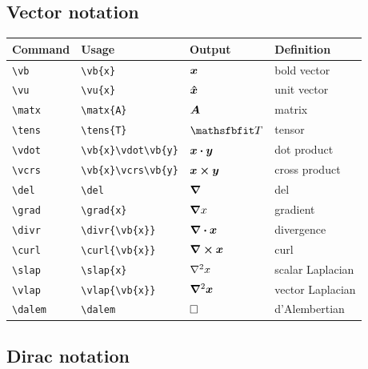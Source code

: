\documentclass[11pt]{article}
\begin{document}
\subsection{Vector notation}

\begin{tabular}{llll}
    Command       & Usage                      & Output                & Definition       \\
    \hline
    \verb|\vb|    & \verb|\vb{x}|              & $\bm{x}$              & bold vector      \\
    \verb|\vu|    & \verb|\vu{x}|              & $\bm{\hat{x}}$              & unit vector      \\
    \verb|\matx|  & \verb|\matx{A}|            & $\bm{A}$            & matrix           \\
    \verb|\tens|  & \verb|\tens{T}|            & $\tens{T}$            & tensor           \\
    \verb|\vdot|  & \verb|\vb{x}\vdot\vb{y}|   & $\bm{x}\bm{\cdot}\bm{y}$   & dot product      \\
    \verb|\vcrs|  & \verb|\vb{x}\vcrs\vb{y}|   & $\bm{x}\bm{\times}\bm{y}$   & cross product    \\
    \verb|\del|   & \verb|\del|                & $\bm{\nabla}$                & del              \\
    \verb|\grad|  & \verb|\grad{x}|            & $\bm{\nabla} x$            & gradient         \\
    \verb|\divr|  & \verb|\divr{\vb{x}}|       & $\bm{\nabla} \bm{\cdot} \bm{x}$       & divergence       \\
    \verb|\curl|  & \verb|\curl{\vb{x}}|       & $\bm{\nabla} \bm{\times} \bm{x}$       & curl             \\
    \verb|\slap|  & \verb|\slap{x}|            & $\nabla^{2} x$            & scalar Laplacian \\
    \verb|\vlap|  & \verb|\vlap{\vb{x}}|       & $\bm{\nabla}^{2} \bm{x}$       & vector Laplacian \\
    \verb|\dalem| & \verb|\dalem|              & $\dalem$              & d'Alembertian    \\
\end{tabular}

\subsection{Dirac notation}
\end{document}

